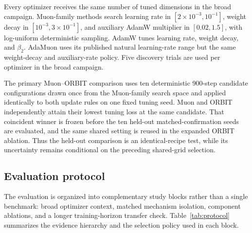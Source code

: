 Every optimizer receives the same number of tuned dimensions in the broad campaign.
Muon-family methods search learning rate in $[2\times10^{-3},10^{-1}]$, weight decay in
$[10^{-3},3\times10^{-1}]$, and auxiliary AdamW multiplier in $[0.02,1.5]$, with
log-uniform deterministic sampling. AdamW tunes learning rate, weight decay, and $\beta_2$.
AdaMuon uses its published natural learning-rate range but the same weight-decay and
auxiliary-rate policy. Five discovery trials are used per optimizer in the broad campaign.

The primary Muon--ORBIT comparison uses ten deterministic 900-step candidate
configurations drawn once from the Muon-family search space and applied identically to both
update rules on one fixed tuning seed. Muon and ORBIT independently attain their lowest
tuning loss at the same candidate. That coincident winner is frozen before the ten held-out
matched-confirmation seeds are evaluated, and the same shared setting is reused in the
expanded ORBIT ablation. Thus the held-out comparison is an identical-recipe test, while its
uncertainty remains conditional on the preceding shared-grid selection.

\subsection{Evaluation protocol}
\label{sec:evaluation-protocol}
The evaluation is organized into complementary study blocks rather than a single benchmark:
broad optimizer context, matched mechanism isolation, component ablations, and a longer
training-horizon transfer check. Table~\ref{tab:protocol} summarizes the evidence hierarchy
and the selection policy used in each block.

